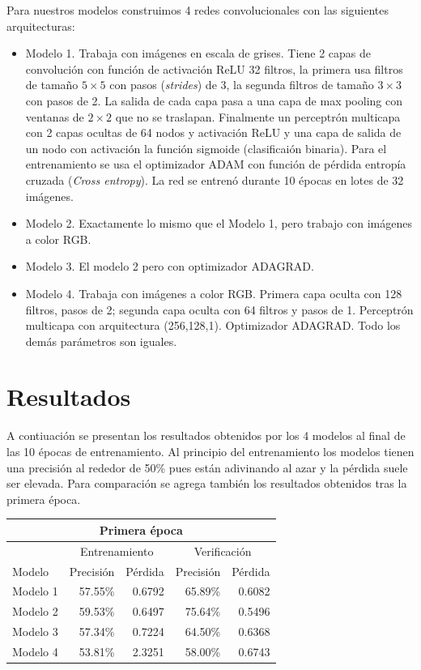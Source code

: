 \documentclass[spanish,11pt,letterpaper]{article}
\begin{document}
Para nuestros modelos construimos 4 redes convolucionales con las siguientes
arquitecturas:

\begin{itemize}
\item Modelo 1. Trabaja con imágenes en escala de grises. Tiene 2 capas de convolución
con función de activación ReLU  32 filtros, la primera usa filtros de tamaño
$5 \times 5$ con pasos (\textit{strides}) de 3, la segunda filtros de tamaño
$3 \times 3$ con pasos de 2. La salida de cada capa pasa a una capa de max pooling
con ventanas de $2 \times 2$ que no se traslapan. Finalmente un perceptrón multicapa
con 2 capas ocultas de 64 nodos y activación ReLU y una capa de salida de un nodo
con activación la función sigmoide (clasificaión binaria). Para el entrenamiento
se usa el optimizador ADAM con función de pérdida entropía cruzada (\textit{Cross entropy}).
La red se entrenó durante 10 épocas en lotes de 32 imágenes.
\item Modelo 2. Exactamente lo mismo que el Modelo 1, pero trabajo con imágenes
a color RGB.
\item Modelo 3. El modelo 2 pero con optimizador ADAGRAD.
\item Modelo 4. Trabaja con imágenes a color RGB. Primera capa oculta con 128
filtros, pasos de 2; segunda capa oculta con 64 filtros y pasos de 1. Perceptrón
multicapa con arquitectura (256,128,1). Optimizador ADAGRAD. Todo los demás
parámetros son iguales.
\end{itemize}

\section{Resultados}

A contiuación se presentan los resultados obtenidos por los 4 modelos al final
de las 10 épocas de entrenamiento. Al principio del entrenamiento los modelos
tienen una precisión al rededor de 50\% pues están adivinando al azar y la pérdida
suele ser elevada. Para comparación se agrega también los resultados obtenidos
tras la primera época.

\begin{center}
\begin{tabular}{|l||r|r|r|r|}
\hline
\multicolumn{5}{|c|}{Primera época}
\\ \hline
& \multicolumn{2}{|c|}{Entrenamiento} & \multicolumn{2}{|c|}{Verificación}
\\ \hline
Modelo & Precisión & Pérdida & Precisión & Pérdida
\\ \hline
Modelo 1 & 57.55\% & 0.6792 & 65.89\% & 0.6082\\
Modelo 2 & 59.53\% & 0.6497 & 75.64\% & 0.5496\\
Modelo 3 & 57.34\% & 0.7224 & 64.50\% & 0.6368\\
Modelo 4 & 53.81\% & 2.3251 & 58.00\% & 0.6743\\
\hline
\end{tabular}
\end{center}
\end{document}
